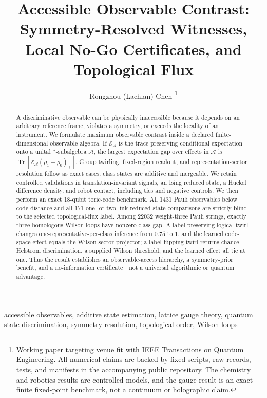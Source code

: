\documentclass[letterpaper,journal]{IEEEtran}
\newcommand{\Tr}{\operatorname{Tr}}
\begin{document}
\title{Accessible Observable Contrast: Symmetry-Resolved Witnesses,
Local No-Go Certificates, and Topological Flux}

\author{Rongzhou (Lachlan) Chen%
\thanks{Working paper targeting venue fit with IEEE Transactions on Quantum
Engineering. All numerical claims are backed by fixed scripts, raw records,
tests, and manifests in the accompanying public repository. The chemistry and
robotics results are controlled models, and the gauge result is an exact
finite fixed-point benchmark, not a continuum or holographic claim.}}

\maketitle

\begin{abstract}
A discriminative observable can be physically inaccessible because it depends
on an arbitrary reference frame, violates a symmetry, or exceeds the locality
of an instrument. We formulate maximum observable contrast inside a declared
finite-dimensional observable algebra. If $\mathcal E_{\mathcal A}$ is the
trace-preserving conditional expectation onto a unital $*$-subalgebra
$\mathcal A$, the largest expectation gap over effects in $\mathcal A$ is
$\Tr[\mathcal E_{\mathcal A}(\rho_1-\rho_0)_+]$. Group twirling, fixed-region
readout, and representation-sector resolution follow as exact cases; class
states are additive and mergeable. We retain controlled validations in
translation-invariant signals, an Ising reduced state, a H{\"u}ckel difference
density, and robot contact, including ties and negative controls. We then
perform an exact 18-qubit toric-code benchmark. All 1431 Pauli observables
below code distance and all 171 one- or two-link reduced-state comparisons are
strictly blind to the selected topological-flux label. Among 22032 weight-three
Pauli strings, exactly three homologous Wilson loops have nonzero class gap.
A label-preserving logical twirl changes one-representative-per-class
inference from $0.75$ to $1$, and the learned code-space effect equals the
Wilson-sector projector; a label-flipping twirl returns chance. Helstrom
discrimination, a supplied Wilson threshold, and the learned effect all tie at
one. Thus the result establishes an observable-access hierarchy, a
symmetry-prior benefit, and a no-information certificate---not a universal
algorithmic or quantum advantage.
\end{abstract}

\begin{IEEEkeywords}
accessible observables, additive state estimation, lattice gauge theory,
quantum state discrimination, symmetry resolution, topological order,
Wilson loops
\end{IEEEkeywords}
\end{document}

